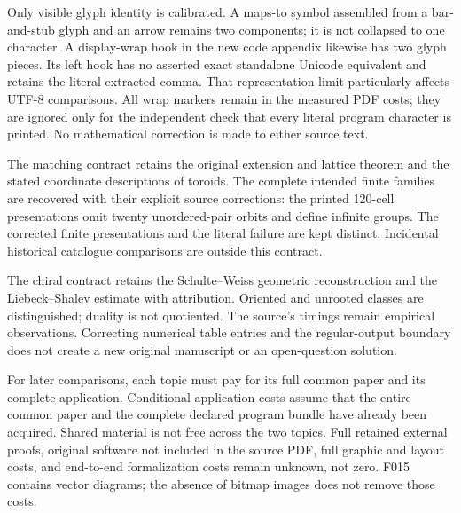 \documentclass[11pt,a4paper]{article}
\begin{document}
Only visible glyph identity is calibrated. A maps-to symbol assembled from a bar-and-stub glyph and an arrow remains two components; it is not collapsed to one character. A display-wrap hook in the new code appendix likewise has two glyph pieces. Its left hook has no asserted exact standalone Unicode equivalent and retains the literal extracted comma. That representation limit particularly affects UTF-8 comparisons. All wrap markers remain in the measured PDF costs; they are ignored only for the independent check that every literal program character is printed. No mathematical correction is made to either source text.

The matching contract retains the original extension and lattice theorem and the stated coordinate descriptions of toroids. The complete intended finite families are recovered with their explicit source corrections: the printed 120-cell presentations omit twenty unordered-pair orbits and define infinite groups. The corrected finite presentations and the literal failure are kept distinct. Incidental historical catalogue comparisons are outside this contract.

The chiral contract retains the Schulte--Weiss geometric reconstruction and the Liebeck--Shalev estimate with attribution. Oriented and unrooted classes are distinguished; duality is not quotiented. The source's timings remain empirical observations. Correcting numerical table entries and the regular-output boundary does not create a new original manuscript or an open-question solution.

For later comparisons, each topic must pay for its full common paper and its complete application. Conditional application costs assume that the entire common paper and the complete declared program bundle have already been acquired. Shared material is not free across the two topics. Full retained external proofs, original software not included in the source PDF, full graphic and layout costs, and end-to-end formalization costs remain unknown, not zero. F015 contains vector diagrams; the absence of bitmap images does not remove those costs.
\end{document}
